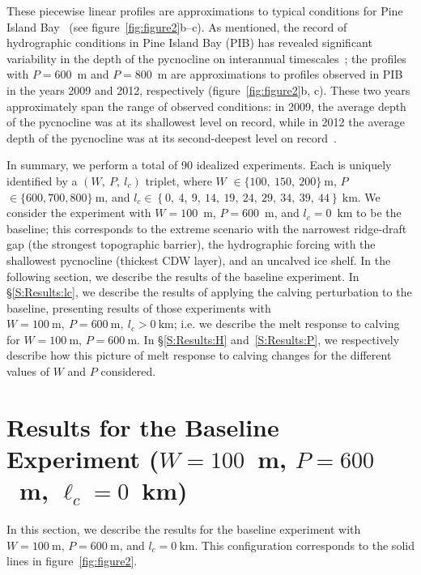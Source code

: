 \documentclass[draft]{agujournal2019}
\begin{document}
These piecewise linear profiles are approximations to typical conditions for Pine Island Bay~\cite{Jacobs1996GRL, Dutrieux2014Science, Jenkins2018NatureGeo} (see figure~\ref{fig:figure2}b--c). As mentioned, the record of hydrographic conditions in Pine Island Bay (PIB) has revealed significant variability in the depth of the pycnocline on interannual timescales~\cite{Dutrieux2014Science}; the profiles with $P=600$~m and $P=800$~m are approximations to profiles observed in PIB in the years 2009 and 2012, respectively (figure~\ref{fig:figure2}b, c). These two years approximately span the range of observed conditions: in 2009, the average depth of the pycnocline was at its shallowest level on record, while in 2012 the average depth of the pycnocline was at its second-deepest level on record~\cite{Webber2017NatureComms}.

In summary, we perform a total of 90 idealized experiments. Each is uniquely identified by a $(W,~P,~l_c)$ triplet, where $W$ $\in \{100,~150,~200\}~\text{m}$, $P$ $\in \{600, 700, 800\}~\text{m}$, and $l_c \in \left\{0,~4,~9,~14,~19,~24,~29,~34,~39,~44\right\}~\text{km}$. We consider the experiment with $W=100$~m, $P=600$~m, and $l_c=0$~km to be the baseline; this corresponds to the extreme scenario with the narrowest ridge-draft gap (the strongest topographic barrier), the hydrographic forcing with the shallowest pycnocline (thickest CDW layer), and an uncalved ice shelf. In the following section, we describe the results of the baseline experiment. In \S\ref{S:Results:lc}, we describe the results of applying the calving perturbation to the baseline, presenting results of those experiments with  $W=100~\text{m},~P=600~\text{m},~l_c>0~\text{km}$; i.e. we describe the melt response to calving for $W=100~\text{m}$, $P = 600~\text{m}$. In \S\ref{S:Results:H} and~\ref{S:Results:P}, we respectively describe how this picture of melt response to calving changes for the different values of $W$ and $P$ considered.


\section{Results for the Baseline Experiment ($W=100$~m, $P=600$~m, $\ell_c = 0$~km)}\label{S:Baseline}
In this section, we describe the results for the baseline experiment with $W=100~\text{m}$, $P=600~\text{m}$, and $l_c=0~\text{km}$. This configuration corresponds to the solid lines in figure~\ref{fig:figure2}.
\end{document}
